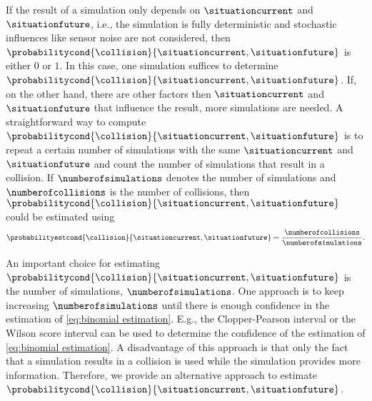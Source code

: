 If the result of a simulation only depends on $\situationcurrent$ and $\situationfuture$, i.e., the simulation is fully deterministic and stochastic influences like sensor noise are not considered, then $\probabilitycond{\collision}{\situationcurrent, \situationfuture}$ is either $0$ or $1$.
In this case, one simulation suffices to determine $\probabilitycond{\collision}{\situationcurrent, \situationfuture}$.
If, on the other hand, there are other factors then $\situationcurrent$ and $\situationfuture$ that influence the result, more simulations are needed.
A straightforward way to compute $\probabilitycond{\collision}{\situationcurrent, \situationfuture}$ is to repeat a certain number of simulations with the same $\situationcurrent$ and $\situationfuture$ and count the number of simulations that result in a collision.
If $\numberofsimulations$ denotes the number of simulations and $\numberofcollisions$ is the number of collisions, then $\probabilitycond{\collision}{\situationcurrent, \situationfuture}$ could be estimated using
\begin{equation}
	\label{eq:binomial estimation}
	\probabilityestcond{\collision}{\situationcurrent, \situationfuture}
	= \frac{\numberofcollisions}{\numberofsimulations}.
\end{equation}

An important choice for estimating $\probabilitycond{\collision}{\situationcurrent, \situationfuture}$ is the number of simulations, $\numberofsimulations$.
One approach is to keep increasing $\numberofsimulations$ until there is enough confidence in the estimation of \cref{eq:binomial estimation}.
E.g., the Clopper-Pearson interval \autocite{clopper1934use} or the Wilson score interval \autocite{wilson1927probable} can be used to determine the confidence of the estimation of \cref{eq:binomial estimation}.
A disadvantage of this approach is that only the fact that a simulation results in a collision is used while the simulation provides more information. 
Therefore, we provide an alternative approach to estimate $\probabilitycond{\collision}{\situationcurrent, \situationfuture}$.

